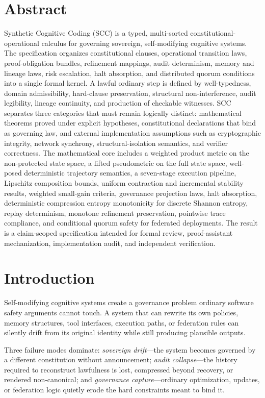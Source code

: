 \documentclass[10pt,oneside]{article}
\theoremstyle{definition}
\theoremstyle{remark}
\begin{document}
\section*{Abstract}
Synthetic Cognitive Coding (SCC) is a typed, multi-sorted constitutional-operational calculus for governing sovereign, self-modifying cognitive systems. The specification organizes constitutional clauses, operational transition laws, proof-obligation bundles, refinement mappings, audit determinism, memory and lineage laws, risk escalation, halt absorption, and distributed quorum conditions into a single formal kernel. A lawful ordinary step is defined by well-typedness, domain admissibility, hard-clause preservation, structural non-interference, audit legibility, lineage continuity, and production of checkable witnesses. SCC separates three categories that must remain logically distinct: mathematical theorems proved under explicit hypotheses, constitutional declarations that bind as governing law, and external implementation assumptions such as cryptographic integrity, network synchrony, structural-isolation semantics, and verifier correctness. The mathematical core includes a weighted product metric on the non-protected state space, a lifted pseudometric on the full state space, well-posed deterministic trajectory semantics, a seven-stage execution pipeline, Lipschitz composition bounds, uniform contraction and incremental stability results, weighted small-gain criteria, governance projection laws, halt absorption, deterministic compression entropy monotonicity for discrete Shannon entropy, replay determinism, monotone refinement preservation, pointwise trace compliance, and conditional quorum safety for federated deployments. The result is a claim-scoped specification intended for formal review, proof-assistant mechanization, implementation audit, and independent verification.

\section{Introduction}
Self-modifying cognitive systems create a governance problem ordinary software safety arguments cannot touch. A system that can rewrite its own policies, memory structures, tool interfaces, execution paths, or federation rules can silently drift from its original identity while still producing plausible outputs.

Three failure modes dominate: 
\emph{sovereign drift}---the system becomes governed by a different constitution without announcement; 
\emph{audit collapse}---the history required to reconstruct lawfulness is lost, compressed beyond recovery, or rendered non-canonical; 
and \emph{governance capture}---ordinary optimization, updates, or federation logic quietly erode the hard constraints meant to bind it.
\end{document}
